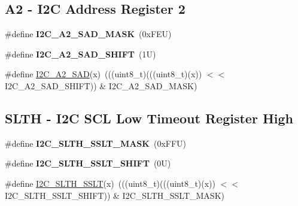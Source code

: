 \subsection*{A2 -\/ I2C Address Register 2}
\begin{DoxyCompactItemize}
\item 
\mbox{\label{group___i2_c___register___masks_ga953881ff63411be620fa173f27ab4efa}} 
\#define {\bfseries I2\+C\+\_\+\+A2\+\_\+\+S\+A\+D\+\_\+\+M\+A\+SK}~(0x\+F\+E\+U)
\item 
\mbox{\label{group___i2_c___register___masks_gad1c31a37087b37cb76faeade10a4fbd6}} 
\#define {\bfseries I2\+C\+\_\+\+A2\+\_\+\+S\+A\+D\+\_\+\+S\+H\+I\+FT}~(1\+U)
\item 
\#define \mbox{\hyperlink{group___i2_c___register___masks_gadb02a0d0b664b563e9f18a9a4d90fb8f}{I2\+C\+\_\+\+A2\+\_\+\+S\+AD}}(x)~(((uint8\+\_\+t)(((uint8\+\_\+t)(x)) $<$$<$ I2\+C\+\_\+\+A2\+\_\+\+S\+A\+D\+\_\+\+S\+H\+I\+FT)) \& I2\+C\+\_\+\+A2\+\_\+\+S\+A\+D\+\_\+\+M\+A\+SK)
\end{DoxyCompactItemize}
\subsection*{S\+L\+TH -\/ I2C S\+CL Low Timeout Register High}
\begin{DoxyCompactItemize}
\item 
\mbox{\label{group___i2_c___register___masks_gaeef081c4825bc9248b218f4c6ee70f86}} 
\#define {\bfseries I2\+C\+\_\+\+S\+L\+T\+H\+\_\+\+S\+S\+L\+T\+\_\+\+M\+A\+SK}~(0x\+F\+F\+U)
\item 
\mbox{\label{group___i2_c___register___masks_gadc7429d429b6c58a18bcf147884e618f}} 
\#define {\bfseries I2\+C\+\_\+\+S\+L\+T\+H\+\_\+\+S\+S\+L\+T\+\_\+\+S\+H\+I\+FT}~(0\+U)
\item 
\#define \mbox{\hyperlink{group___i2_c___register___masks_gaf6d95ca3bdf2d8da490e7ff3c4a937b7}{I2\+C\+\_\+\+S\+L\+T\+H\+\_\+\+S\+S\+LT}}(x)~(((uint8\+\_\+t)(((uint8\+\_\+t)(x)) $<$$<$ I2\+C\+\_\+\+S\+L\+T\+H\+\_\+\+S\+S\+L\+T\+\_\+\+S\+H\+I\+FT)) \& I2\+C\+\_\+\+S\+L\+T\+H\+\_\+\+S\+S\+L\+T\+\_\+\+M\+A\+SK)
\end{DoxyCompactItemize}

